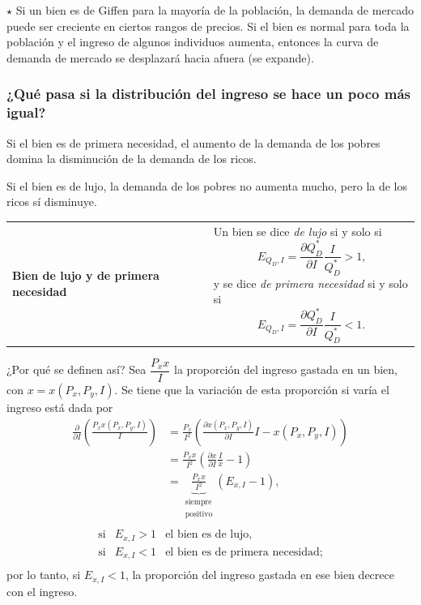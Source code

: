 \documentclass{report}
\newenvironment{obs}{$\star$ }{}
\newenvironment{definition}[1]{\begin{center}
\begin{tabular}{p{3.5cm} p{12.5cm}}
\textbf{#1} &
}
{\\ \end{tabular}\end{center}}
\begin{document}
\begin{obs}
Si un bien es de Giffen para la mayoría de la población, la demanda de mercado puede ser creciente en ciertos rangos de precios. Si el bien es normal para toda la población y el ingreso de algunos individuos aumenta, entonces la curva de demanda de mercado se desplazará hacia afuera (se expande).
\end{obs}

\subsubsection{¿Qué pasa si la distribución del ingreso se hace un poco más igual?}

Si el bien es de primera necesidad, el aumento de la demanda de los pobres domina la disminución de la demanda de los ricos.

Si el bien es de lujo, la demanda de los pobres no aumenta mucho, pero la de los ricos sí disminuye.

\begin{definition}{Bien de lujo y de primera necesidad}
Un bien se dice \textit{de lujo} si y solo si
$$E_{Q_D,I}=\frac{\partial Q_D^*}{\partial I}\frac{I}{Q_D^*}>1\text{,}$$
y se dice \textit{de primera necesidad} si y solo si
$$E_{Q_D,I}=\frac{\partial Q_D^*}{\partial I}\frac{I}{Q_D^*}<1\text{.}$$
\end{definition}

¿Por qué se definen así? Sea $\dfrac{P_xx}{I}$ la proporción del ingreso gastada en un bien, con $x=x\!\left(P_x,P_y,I\right)$. Se tiene que la variación de esta proporción si varía el ingreso está dada por
\begin{align}
\frac{\partial}{\partial I}\left(\frac{P_xx\!\left(P_x,P_y,I\right)}{I}\right)&=\frac{P_x}{I^2}\left(\frac{\partial x\!\left(P_x,P_y,I\right)}{\partial I}I-x\!\left(P_x,P_y,I\right)\right)\\
{}&=\frac{P_xx}{I^2}\left(\frac{\partial x}{\partial I}\frac{I}{x}-1\right)\\
{}&=\underbrace{\frac{P_xx}{I^2}}_{\mathrm{
\begin{smallmatrix}
\text{siempre}\\
\text{positivo}
\end{smallmatrix}
}}\left(E_{x,I}-1\right)\text{,}\\
\end{align}
$$
\begin{matrix}
\text{si} & E_{x,I} > 1 & \text{el bien es de lujo,} \\
\text{si} & E_{x,I} < 1 & \text{el bien es de primera necesidad;}\\
\end{matrix}
$$
por lo tanto, si $E_{x,I} < 1$, la proporción del ingreso gastada en ese bien decrece con el ingreso.
\end{document}
